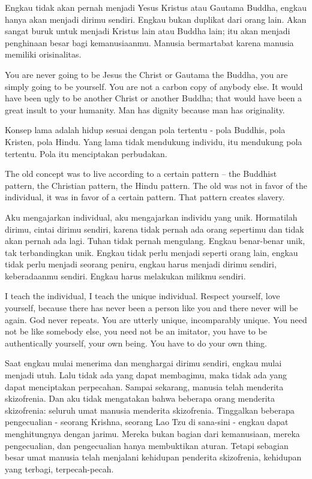 \bahasa
Engkau tidak akan pernah menjadi Yesus Kristus atau Gautama Buddha, engkau hanya akan menjadi dirimu sendiri. Engkau bukan duplikat dari orang lain. Akan sangat buruk untuk menjadi Kristus lain atau Buddha lain; itu akan menjadi penghinaan besar bagi kemanusiaanmu. Manusia bermartabat karena manusia memiliki orisinalitas.

\english
You are never going to be Jesus the Christ or Gautama the Buddha, you are simply going to be yourself. You are not a carbon copy of anybody else. It would have been ugly to be another Christ or another Buddha; that would have been a great insult to your humanity. Man has dignity because man has originality.

\bahasa
Konsep lama adalah hidup sesuai dengan pola tertentu - pola Buddhis, pola Kristen, pola Hindu. Yang lama tidak mendukung individu, itu mendukung pola tertentu. Pola itu menciptakan perbudakan.

\english
The old concept was to live according to a certain pattern -- the Buddhist pattern, the Christian pattern, the Hindu pattern. The old was not in favor of the individual, it was in favor of a certain pattern. That pattern creates slavery.

\bahasa
Aku mengajarkan individual, aku mengajarkan individu yang unik. Hormatilah dirimu, cintai dirimu sendiri, karena tidak pernah ada orang sepertimu dan tidak akan pernah ada lagi. Tuhan tidak pernah mengulang. Engkau benar-benar unik, tak terbandingkan unik. Engkau tidak perlu menjadi seperti orang lain, engkau tidak perlu menjadi seorang peniru, engkau harus menjadi dirimu sendiri, keberadaanmu sendiri. Engkau harus melakukan milikmu sendiri.

\english
I teach the individual, I teach the unique individual. Respect yourself, love yourself, because there has never been a person like you and there never will be again. God never repeats. You are utterly unique, incomparably unique. You need not be like somebody else, you need not be an imitator, you have to be authentically yourself, your own being. You have to do your own thing.

\bahasa
Saat engkau mulai menerima dan menghargai dirimu sendiri, engkau mulai menjadi utuh. Lalu tidak ada yang dapat membagimu, maka tidak ada yang dapat menciptakan perpecahan. Sampai sekarang, manusia telah menderita skizofrenia. Dan aku tidak mengatakan bahwa beberapa orang menderita skizofrenia: seluruh umat manusia menderita skizofrenia. Tinggalkan beberapa pengecualian - seorang Krishna, seorang Lao Tzu di sana-sini - engkau dapat menghitungnya dengan jarimu. Mereka bukan bagian dari kemanusiaan, mereka pengecualian, dan pengecualian hanya membuktikan aturan. Tetapi sebagian besar umat manusia telah menjalani kehidupan penderita skizofrenia, kehidupan yang terbagi, terpecah-pecah.

